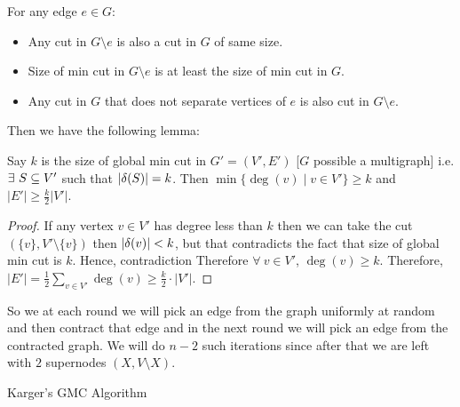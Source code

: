\begin{observation*}For any edge $e\in G$:
	\begin{itemize}
		\item Any cut in $G\setminus e$ is also a cut in $G$ of same size.
		\item Size of min cut in $G\setminus e$ is at least the size of min cut in $G$.
		\item Any cut in $G$ that does not separate vertices of $e$ is also cut in $G\setminus e$.
	\end{itemize}
\end{observation*}

Then we have the following lemma:
\begin{lemma}{}{}
	Say $k$ is the size of global min cut in $G'=(V',E')$ [$G$ possible a multigraph] i.e. $\exists\ S\subseteq V'$ such that $|\delta(S)|=k$. Then $\min \{\deg(v)\mid v\in V'\}\geq k$ and $|E'|\geq \frac{k}{2}|V'|$.
\end{lemma}
\begin{proof}
	If any vertex $v\in V'$ has degree less than $k$ then we can take the cut $(\{v\}, V'\setminus\{v\})$ then $|\delta(v)|<k$, but that contradicts the fact that size of global min cut is $k$. Hence, contradiction \ctr Therefore $\forall\ v\in V'$, $\deg(v)\geq k$. Therefore, $|E'|=\frac12\sum\limits_{v\in V'}\deg(v)\geq \frac{k}2\cdot |V'|$.
\end{proof}

So we at each round we will pick an edge from the graph uniformly at random and then contract that edge and in the next round we will pick an edge from the contracted graph. We will do $n-2$ such iterations since after that we are left with $2$ supernodes $(X,V\setminus X)$.
\begin{algorithm}
	\caption{Karger's GMC Algorithm}
\end{algorithm}

